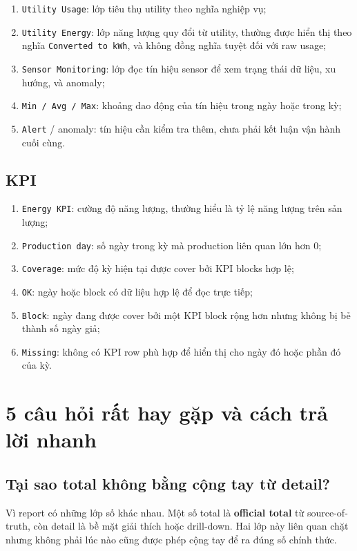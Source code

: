 \begin{enumerate}[label=-]
\item \texttt{Utility Usage}: lớp tiêu thụ utility theo nghĩa nghiệp vụ;
\item \texttt{Utility Energy}: lớp năng lượng quy đổi từ utility, thường được hiển thị theo nghĩa \texttt{Converted to kWh}, và không đồng nghĩa tuyệt đối với raw usage;
\item \texttt{Sensor Monitoring}: lớp đọc tín hiệu sensor để xem trạng thái dữ liệu, xu hướng, và anomaly;
\item \texttt{Min / Avg / Max}: khoảng dao động của tín hiệu trong ngày hoặc trong kỳ;
\item \texttt{Alert} / anomaly: tín hiệu cần kiểm tra thêm, chưa phải kết luận vận hành cuối cùng.
\end{enumerate}

\subsection{KPI}

\begin{enumerate}[label=-]
\item \texttt{Energy KPI}: cường độ năng lượng, thường hiểu là tỷ lệ năng lượng trên sản lượng;
\item \texttt{Production day}: số ngày trong kỳ mà production liên quan lớn hơn 0;
\item \texttt{Coverage}: mức độ kỳ hiện tại được cover bởi KPI blocks hợp lệ;
\item \texttt{OK}: ngày hoặc block có dữ liệu hợp lệ để đọc trực tiếp;
\item \texttt{Block}: ngày đang được cover bởi một KPI block rộng hơn nhưng không bị bẻ thành số ngày giả;
\item \texttt{Missing}: không có KPI row phù hợp để hiển thị cho ngày đó hoặc phần đó của kỳ.
\end{enumerate}

\section{5 câu hỏi rất hay gặp và cách trả lời nhanh}

\subsection{Tại sao total không bằng cộng tay từ detail?}

Vì report có những lớp số khác nhau. Một số total là \textbf{official total} từ source-of-truth, còn detail là bề mặt giải thích hoặc drill-down. Hai lớp này liên quan chặt nhưng không phải lúc nào cũng được phép cộng tay để ra đúng số chính thức.

